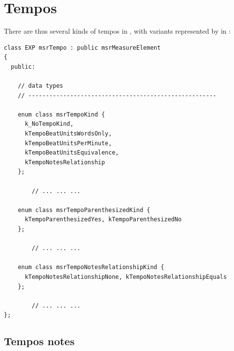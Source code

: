 \section{Tempos}\label{Tempos}

There are thus several kinds of tempos in \msrRepr, with variants represented by  in :
\begin{lstlisting}[language=CPlusPlus]
class EXP msrTempo : public msrMeasureElement
{
  public:

    // data types
    // ------------------------------------------------------

    enum class msrTempoKind {
      k_NoTempoKind,
      kTempoBeatUnitsWordsOnly,
      kTempoBeatUnitsPerMinute,
      kTempoBeatUnitsEquivalence,
      kTempoNotesRelationship
    };

		// ... ... ...

    enum class msrTempoParenthesizedKind {
      kTempoParenthesizedYes, kTempoParenthesizedNo
    };

		// ... ... ...

    enum class msrTempoNotesRelationshipKind {
      kTempoNotesRelationshipNone, kTempoNotesRelationshipEquals
    };

		// ... ... ...
};
\end{lstlisting}


\subsection{Tempos notes}\label{Tempos notes}

